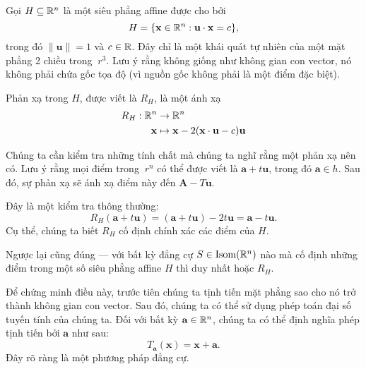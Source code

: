 \begin{eg}
  Gọi $H \subseteq \mathbb{R}^n$ là một siêu phẳng affine được cho bởi
  \[
    H = \{\mathbf{x} \in \mathbb{R}^n: \mathbf{u} \cdot \mathbf{x} = c\},
  \]
  trong đó $\|\mathbf{u}\| = 1$ và $c \in \mathbb{R}$. Đây chỉ là một khái quát tự nhiên của một mặt phẳng 2 chiều trong $ \ r^3 $. Lưu ý rằng không giống như không gian con vector, nó không phải chứa gốc tọa độ (vì nguồn gốc không phải là một điểm đặc biệt).

  Phản xạ trong $H$, được viết là $R_H$, là một ánh xạ
  \begin{align*}
    R_H: \mathbb{R}^n &\to \mathbb{R}^n\\
    \mathbf{x} &\mapsto \mathbf{x} - 2(\mathbf{x} \cdot \mathbf{u} - c)\mathbf{u}
  \end{align*}

    Chúng ta cần kiểm tra những tính chất mà chúng ta nghĩ rằng một phản xạ nên có. Lưu ý rằng mọi điểm trong $ \ r^n $ có thể được viết là $\mathbf {a} + t \mathbf {u} $, trong đó $ \mathbf {a} \in h $. Sau đó, sự phản xạ sẽ ánh xạ điểm này đến $\mathbf {A} - T \mathbf {u} $.
  \begin{center}
  \end{center}
  Đây là một kiểm tra thông thường:
  \[
    R_H (\mathbf{a} + t\mathbf{u}) = (\mathbf{a} + t\mathbf{u}) - 2t\mathbf{u} = \mathbf{a} - t\mathbf{u}.
  \]
  Cụ thể, chúng ta biết $R_H$ cố định chính xác các điểm của $H$.

  Ngược lại cũng đúng --- với bất kỳ đẳng cự $S \in \operatorname{Isom}(\mathbb{R}^n)$ nào mà cố định những điểm trong một số siêu phẳng affine $H$ thì duy nhất hoặc $R_H$.
  
  Để chứng minh điều này, trước tiên chúng ta tịnh tiến mặt phẳng sao cho nó trở thành không gian con vector. Sau đó, chúng ta có thể sử dụng phép toán đại số tuyến tính của chúng ta. Đối với bất kỳ $\mathbf {a} \in \mathbb{R}^n $, chúng ta có thể định nghĩa phép tịnh tiến bởi $\mathbf{a}$ như sau:
  \[
    T_{\mathbf{a}}(\mathbf{x}) = \mathbf{x} + \mathbf{a}.
  \]
  Đây rõ ràng là một phương pháp đẳng cự.


\end{eg}
